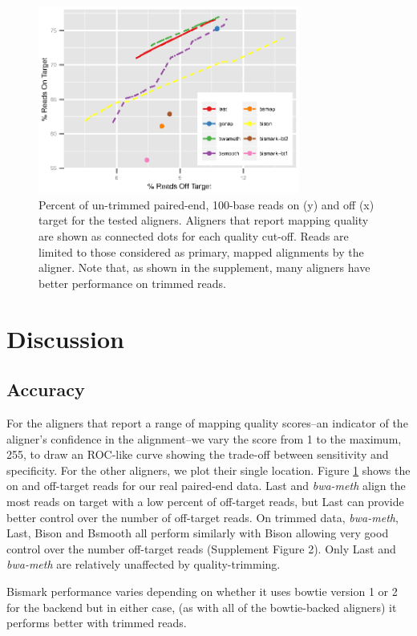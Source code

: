 \documentclass{bioinfo}
\begin{document}
\begin{figure}[!tpb]%
    \centerline{\includegraphics[width=86mm]{real-quals}}
    \caption{Percent of un-trimmed paired-end, 100-base reads on (y) and off (x)
    target for the tested aligners. Aligners that report mapping quality are
shown as connected dots for each quality cut-off. Reads are limited to those
considered as primary, mapped alignments by the aligner. Note that, as shown
in the supplement, many aligners have better performance on trimmed reads.
}\label{fig:01}
\end{figure}

\section{Discussion}

\subsection{Accuracy}
For the aligners that report a range of mapping quality
scores--an indicator of the aligner's confidence in the
alignment--we vary the score from 1 to the maximum, 255, to draw an ROC-like
curve showing the trade-off between sensitivity and specificity. For the
other aligners, we plot their single location. Figure \ref{fig:01} shows
the on and off-target reads for our real paired-end data. Last and 
\textit{bwa-meth} align the most reads on target with a low percent
of off-target reads, but Last can provide better control over the number
of off-target reads. On trimmed data, \textit{bwa-meth}, Last, Bison and
Bsmooth all perform similarly with Bison allowing very good control
over the number off-target reads (Supplement Figure 2).
Only Last and \textit{bwa-meth} are relatively unaffected by quality-trimming.

Bismark performance varies depending on whether it uses bowtie version
1 or 2 for the backend but in either case, (as with all of the bowtie-backed
aligners) it performs better with trimmed reads.
\end{document}
